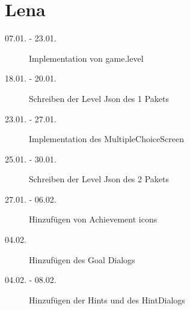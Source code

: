 \section{Lena}
\begin{description}
\item[07.01. - 23.01.]
Implementation von game.level
\item[18.01. - 20.01.]
Schreiben der Level Json des 1 Pakets
\item[23.01. - 27.01.]
Implementation des MultipleChoiceScreen
\item[25.01. - 30.01.]
Schreiben der Level Json des 2 Pakets
\item[27.01. - 06.02.]
Hinzufügen von Achievement icons
\item[04.02.]
Hinzufügen des Goal Dialogs
\item[04.02. - 08.02.]
Hinzufügen der Hints und des HintDialogs
\end{description}
